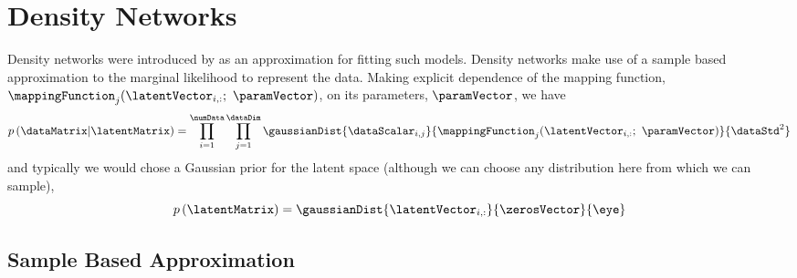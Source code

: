 \section{Density Networks}

Density networks were introduced by \cite{MacKay:wondsa95} as an
approximation for fitting such models. Density networks make use of a
sample based approximation to the marginal likelihood to represent the
data. Making explicit dependence of the mapping function,
$\mappingFunction_{j}(\latentVector_{i, :};\ \paramVector)$, on its
parameters, $\paramVector$, we have
\[
p\left(\dataMatrix|\latentMatrix\right)=\prod_{i=1}^{\numData}\prod_{j=1}^{\dataDim}\gaussianDist{\dataScalar_{i,j}}{\mappingFunction_{j}(\latentVector_{i,:};\ \paramVector)}{\dataStd^{2}}
\]
and typically we would chose a Gaussian prior for the latent space
(although we can choose any distribution here from which we can sample),
\[
  p\left(\latentMatrix\right)=\gaussianDist{\latentVector_{i,:}}{\zerosVector}{\eye}
\]

\subsection{Sample Based Approximation}

